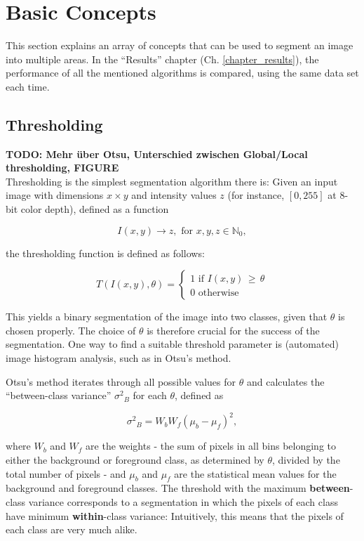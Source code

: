 \chapter{Basic Concepts}

This section explains an array of concepts that can be used to segment an image into multiple areas. In the ``Results'' chapter (Ch. \ref{chapter_results}), the performance of all the mentioned algorithms is compared, using the same data set each time.
	
	\section{Thresholding}
\textbf{TODO: Mehr über Otsu, Unterschied zwischen Global/Local thresholding, FIGURE}\\
Thresholding is the simplest segmentation algorithm there is: Given an input image with dimensions $x \times y$ and intensity values $z$ (for instance, $[0, 255]$ at 8-bit color depth), defined as a function 

\[I(x, y) \to z, \text{ for } x, y, z \in \mathbb{N}_0,\]

\noindent the thresholding function is defined as follows:

\[ T(I(x, y), \theta) =  \begin{cases}
				1 \text{ if } I(x, y) \, \geq \, \theta \\
			           0 \text{ otherwise}
			     \end{cases}
\]


\noindent This yields a binary segmentation of the image into two classes, given that $\theta$ is chosen properly. The choice of $\theta$ is therefore crucial for the success of the segmentation. One way to find a suitable threshold parameter is (automated) image histogram analysis, such as in Otsu's method\cite{Otsu}.

Otsu's method iterates through all possible values for $\theta$ and calculates the ``between-class variance'' ${\sigma^{2}}_B$ for each $\theta$, defined as

\[ {\sigma^2}_{B} = W_b W_f (\mu_b - \mu_f)^2,\]

\noindent where $W_b$ and $W_f$ are the weights - the sum of pixels in all bins belonging to either the background or foreground class, as determined by $\theta$, divided by the total number of pixels - and $\mu_b$ and $\mu_f$ are the statistical mean values for the background and foreground classes. The threshold with the maximum \textbf{between}-class variance corresponds to a segmentation in which the pixels of each class have minimum \textbf{within}-class variance: Intuitively, this means that the pixels of each class are very much alike.

